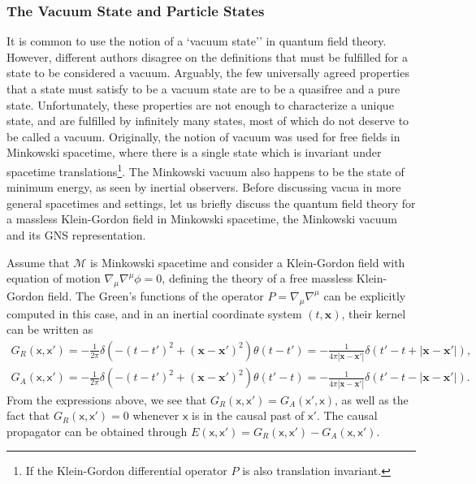 \documentclass[letterpaper,12pt,titlepage,oneside,final]{book}
\newcommand{\M}{\mathcal{M}}
\newcommand{\mf}{\mathsf}%
\begin{document}
\subsubsection*{The Vacuum State and Particle States}

It is common to use the notion of a `vacuum state'' in quantum field theory. However, different authors disagree on the definitions that must be fulfilled for a state to be considered a vacuum. Arguably, the few universally agreed properties that a state must satisfy to be a vacuum state are to be a quasifree and a pure state. Unfortunately, these properties are not enough to characterize a unique state, and are fulfilled by infinitely many states, most of which do not deserve to be called a vacuum. Originally, the notion of vacuum was used for free fields in Minkowski spacetime, where there is a single state which is invariant under spacetime translations\footnote{If the Klein-Gordon differential operator $P$ is also translation invariant.}. The Minkowski vacuum also happens to be the state of minimum energy, as seen by inertial observers. Before discussing vacua in more general spacetimes and settings, let us briefly discuss the quantum field theory for a massless Klein-Gordon field in Minkowski spacetime, the Minkowski vacuum and its GNS representation.

Assume that $\M$ is Minkowski spacetime and consider a Klein-Gordon field with equation of motion $\nabla_\mu\nabla^\mu\phi = 0$, defining the theory of a free massless Klein-Gordon field. The Green's functions of the operator $P = \nabla_\mu \nabla^\mu$ can be explicitly computed in this case, and in an inertial coordinate system $(t,\bm x)$, their kernel can be written as
\begin{align}
    G_R(\mf x, \mf x') = - \frac{1}{2\pi}\delta(- (t-t')^2 + (\bm x - \bm x')^2)\theta(t-t') = -\frac{1}{4\pi|\bm x - \bm x'|}\delta(t'-t+|\bm x - \bm x'|),\nonumber\\
    G_A(\mf x, \mf x') =  - \frac{1}{2\pi}\delta(- (t-t')^2 + (\bm x - \bm x')^2)\theta(t'-t) = -\frac{1}{4\pi|\bm x - \bm x'|}\delta(t'-t-|\bm x - \bm x'|).\label{eq:GRGA}
\end{align}
From the expressions above, we see that $G_R(\mf x, \mf x') = G_A(\mf x',\mf x)$, as well as the fact that $G_R(\mf x, \mf x') = 0$ whenever $\mf x$ is in the causal past of $\mf x'$. The causal propagator can be obtained through $E(\mf x, \mf x') = G_R(\mf x, \mf x') - G_A(\mf x, \mf x')$.
\end{document}

